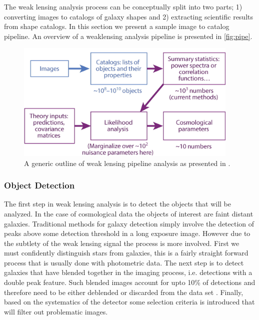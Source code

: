 The weak lensing analysis process can be conceptually split into two parts; 1) converting images to catalogs of galaxy shapes and 2) extracting scientific results from shape catalogs. In this section we present a sample image to catalog pipeline. An overview of a weaklensing analysis pipeline is presented in \autoref{fig:pipe}.

\begin{figure}
    \begin{small}
        \begin{center}
            \includegraphics[width=0.95\textwidth]{figs/pipe.jpg}
        \end{center}
        \caption{A generic outline of weak lensing pipeline analysis as presented in \cite{rachel_2018}.}
        \label{fig:pipe}
    \end{small}
\end{figure}


\subsubsection{Object Detection}

The first step in weak lensing analysis is to detect the objects that will be analyzed. In the case of cosmological data the objects of interest are faint distant galaxies. Traditional methods for galaxy detection simply involve the detection of peaks above some detection threshold in a long exposure image. However due to the subtlety of the weak lensing signal the process is more involved. First we must confidently distinguish stars from galaxies, this is a fairly straight forward process that is usually done with photometric data. The next step is to detect galaxies that have blended together in the imaging process, i.e. detections with a double peak feature. Such blended images account for upto 10\% of detections and therefore need to be either deblended or discarded from the data set \cite{rachel_2018,general_2013}. Finally, based on the systematics of the detector some selection criteria is introduced that will filter out problematic images. 

